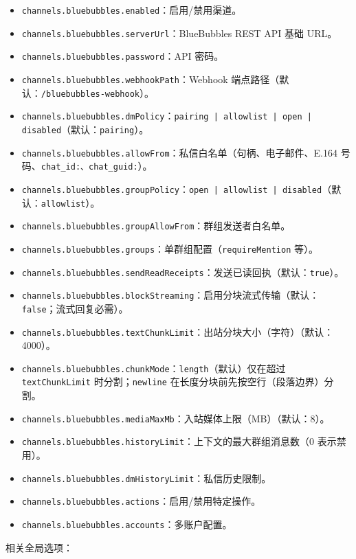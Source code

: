 \begin{itemize}
  \item \texttt{channels.bluebubbles.enabled}：启用/禁用渠道。
  \item \texttt{channels.bluebubbles.serverUrl}：BlueBubbles REST API 基础 URL。
  \item \texttt{channels.bluebubbles.password}：API 密码。
  \item \texttt{channels.bluebubbles.webhookPath}：Webhook 端点路径（默认：\texttt{/bluebubbles-webhook}）。
  \item \texttt{channels.bluebubbles.dmPolicy}：\texttt{pairing | allowlist | open | disabled}（默认：\texttt{pairing}）。
  \item \texttt{channels.bluebubbles.allowFrom}：私信白名单（句柄、电子邮件、E.164 号码、\texttt{chat\_id:\textit{}、\texttt{chat\_guid:}}）。
  \item \texttt{channels.bluebubbles.groupPolicy}：\texttt{open | allowlist | disabled}（默认：\texttt{allowlist}）。
  \item \texttt{channels.bluebubbles.groupAllowFrom}：群组发送者白名单。
  \item \texttt{channels.bluebubbles.groups}：单群组配置（\texttt{requireMention} 等）。
  \item \texttt{channels.bluebubbles.sendReadReceipts}：发送已读回执（默认：\texttt{true}）。
  \item \texttt{channels.bluebubbles.blockStreaming}：启用分块流式传输（默认：\texttt{false}；流式回复必需）。
  \item \texttt{channels.bluebubbles.textChunkLimit}：出站分块大小（字符）（默认：4000）。
  \item \texttt{channels.bluebubbles.chunkMode}：\texttt{length}（默认）仅在超过 \texttt{textChunkLimit} 时分割；\texttt{newline} 在长度分块前先按空行（段落边界）分割。
  \item \texttt{channels.bluebubbles.mediaMaxMb}：入站媒体上限（MB）（默认：8）。
  \item \texttt{channels.bluebubbles.historyLimit}：上下文的最大群组消息数（0 表示禁用）。
  \item \texttt{channels.bluebubbles.dmHistoryLimit}：私信历史限制。
  \item \texttt{channels.bluebubbles.actions}：启用/禁用特定操作。
  \item \texttt{channels.bluebubbles.accounts}：多账户配置。
\end{itemize}


相关全局选项：

